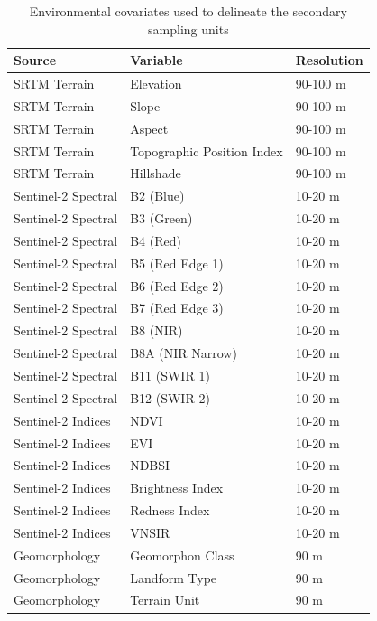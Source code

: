 \documentclass[
  10pt,
  b5paper,
  oneside]{book}
\begin{document}
\begin{table}

\caption{\label{tab:ssu-covariates}Environmental covariates used to delineate the secondary sampling units}
\centering
\begin{tabular}[t]{l|l|l}
\hline
Source & Variable & Resolution\\
\hline
SRTM Terrain & Elevation & 90-100 m\\
\hline
SRTM Terrain & Slope & 90-100 m\\
\hline
SRTM Terrain & Aspect & 90-100 m\\
\hline
SRTM Terrain & Topographic Position Index & 90-100 m\\
\hline
SRTM Terrain & Hillshade & 90-100 m\\
\hline
Sentinel-2 Spectral & B2 (Blue) & 10-20 m\\
\hline
Sentinel-2 Spectral & B3 (Green) & 10-20 m\\
\hline
Sentinel-2 Spectral & B4 (Red) & 10-20 m\\
\hline
Sentinel-2 Spectral & B5 (Red Edge 1) & 10-20 m\\
\hline
Sentinel-2 Spectral & B6 (Red Edge 2) & 10-20 m\\
\hline
Sentinel-2 Spectral & B7 (Red Edge 3) & 10-20 m\\
\hline
Sentinel-2 Spectral & B8 (NIR) & 10-20 m\\
\hline
Sentinel-2 Spectral & B8A (NIR Narrow) & 10-20 m\\
\hline
Sentinel-2 Spectral & B11 (SWIR 1) & 10-20 m\\
\hline
Sentinel-2 Spectral & B12 (SWIR 2) & 10-20 m\\
\hline
Sentinel-2 Indices & NDVI & 10-20 m\\
\hline
Sentinel-2 Indices & EVI & 10-20 m\\
\hline
Sentinel-2 Indices & NDBSI & 10-20 m\\
\hline
Sentinel-2 Indices & Brightness Index & 10-20 m\\
\hline
Sentinel-2 Indices & Redness Index & 10-20 m\\
\hline
Sentinel-2 Indices & VNSIR & 10-20 m\\
\hline
Geomorphology & Geomorphon Class & 90 m\\
\hline
Geomorphology & Landform Type & 90 m\\
\hline
Geomorphology & Terrain Unit & 90 m\\
\hline
\end{tabular}
\end{table}
\end{document}
